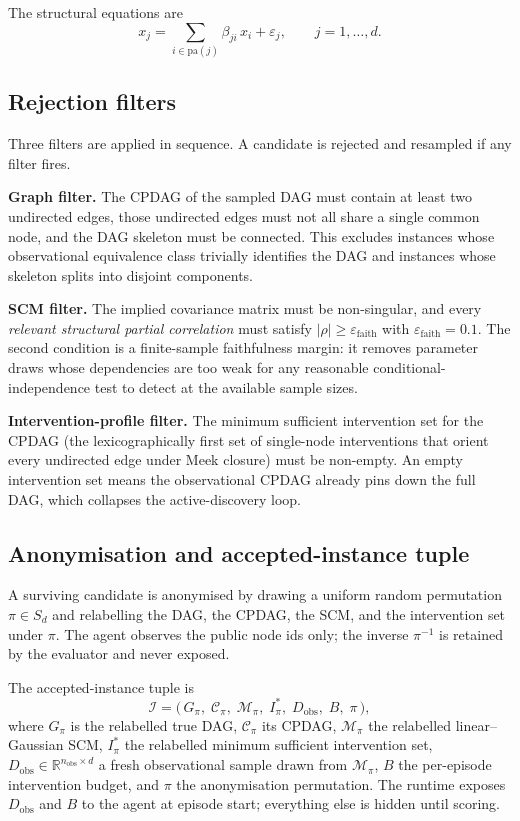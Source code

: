 The structural equations are
\begin{equation}
x_j = \sum_{i \in \mathrm{pa}(j)} \beta_{ji} \, x_i + \varepsilon_j,
\qquad j = 1, \ldots, d.
\end{equation}

\subsection{Rejection filters}
\label{app:instance:filters}

Three filters are applied in sequence. A candidate is rejected and resampled if any filter fires.

\textbf{Graph filter.} The CPDAG of the sampled DAG must contain at least two undirected edges, those undirected edges must not all share a single common node, and the DAG skeleton must be connected. This excludes instances whose observational equivalence class trivially identifies the DAG and instances whose skeleton splits into disjoint components.

\textbf{SCM filter.} The implied covariance matrix must be non-singular, and every \emph{relevant structural partial correlation} must satisfy $|\rho| \geq \varepsilon_{\mathrm{faith}}$ with $\varepsilon_{\mathrm{faith}} = 0.1$. The second condition is a finite-sample faithfulness margin: it removes parameter draws whose dependencies are too weak for any reasonable conditional-independence test to detect at the available sample sizes.

\textbf{Intervention-profile filter.} The minimum sufficient intervention set for the CPDAG (the lexicographically first set of single-node interventions that orient every undirected edge under Meek closure) must be non-empty. An empty intervention set means the observational CPDAG already pins down the full DAG, which collapses the active-discovery loop.

\subsection{Anonymisation and accepted-instance tuple}
\label{app:instance:anon}

A surviving candidate is anonymised by drawing a uniform random permutation $\pi \in S_d$ and relabelling the DAG, the CPDAG, the SCM, and the intervention set under $\pi$. The agent observes the public node ids only; the inverse $\pi^{-1}$ is retained by the evaluator and never exposed.

The accepted-instance tuple is
\begin{equation}
\mathcal{I} = \big(\, G_\pi,\; \mathcal{C}_\pi,\; \mathcal{M}_\pi,\; I^*_\pi,\; D_{\mathrm{obs}},\; B,\; \pi \,\big),
\end{equation}
where $G_\pi$ is the relabelled true DAG, $\mathcal{C}_\pi$ its CPDAG, $\mathcal{M}_\pi$ the relabelled linear--Gaussian SCM, $I^*_\pi$ the relabelled minimum sufficient intervention set, $D_{\mathrm{obs}} \in \mathbb{R}^{n_{\mathrm{obs}} \times d}$ a fresh observational sample drawn from $\mathcal{M}_\pi$, $B$ the per-episode intervention budget, and $\pi$ the anonymisation permutation. The runtime exposes $D_{\mathrm{obs}}$ and $B$ to the agent at episode start; everything else is hidden until scoring.

